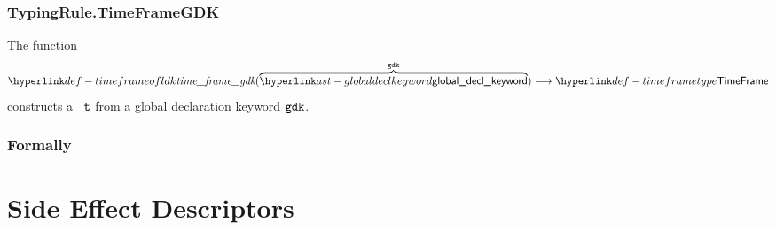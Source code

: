 \subsubsection{TypingRule.TimeFrameGDK\label{sec:TypingRule.TimeFrameGDK}}
\hypertarget{def-timeframeofgdk}{}
The function
\[
    \timeframeofgdk(\overname{\globaldeclkeyword}{\gdk}) \aslto \TTimeFrame
\]
constructs a \timeframeterm\ $\vt$ from a global declaration keyword $\gdk$.

\subsubsection{Formally}
\begin{mathpar}
\end{mathpar}

\section{Side Effect Descriptors\label{sec:SideEffectDescriptors}}

